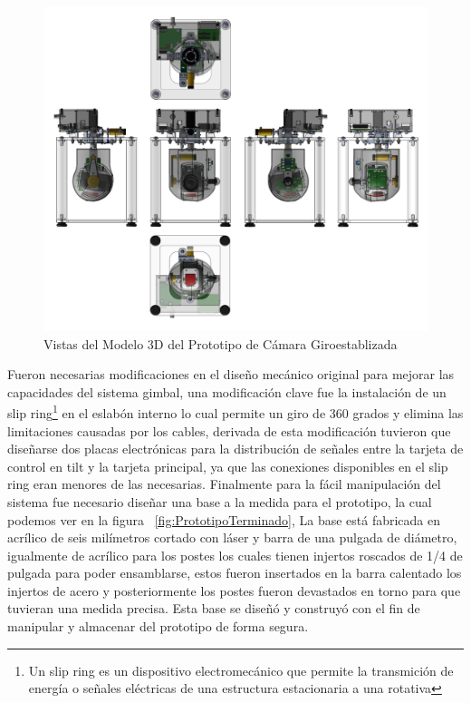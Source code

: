 \begin{figure}[H]
\centering \includegraphics[scale=0.25]{img/GimbalViews.png}
\caption{Vistas del Modelo 3D del Prototipo de C\'{a}mara Giroestablizada}%
\label{fig:GimbalViews}%
\end{figure}

Fueron necesarias modificaciones en el dise\~{n}o mec\'{a}nico original para mejorar las capacidades del sistema gimbal, una modificaci\'{o}n clave fue la instalaci\'{o}n de un slip ring\footnote{Un slip ring es un dispositivo electromec\'{a}nico que permite la transmici\'{o}n de energ\'{i}a o se\~{n}ales el\'{e}ctricas de una estructura estacionaria a una rotativa} en el eslab\'{o}n interno lo cual permite un giro de 360 grados y elimina las limitaciones causadas por los cables, derivada de esta modificaci\'{o}n tuvieron que dise\~{n}arse dos placas electr\'{o}nicas para la distribuci\'{o}n de se\~{n}ales entre la tarjeta de control en tilt y la tarjeta principal, ya que las conexiones disponibles en el slip ring eran menores de las necesarias. Finalmente para la f\'{a}cil manipulaci\'{o}n del sistema fue necesario dise\~{n}ar una base a la medida para el prototipo, la cual podemos ver en la figura ~\ref{fig:PrototipoTerminado}, La base est\'{a} fabricada en acr\'{i}lico de seis mil\'{i}metros cortado con l\'{a}ser y barra de una pulgada de di\'{a}metro, igualmente de acr\'{i}lico para los postes los cuales tienen injertos roscados de 1/4 de pulgada para poder ensamblarse, estos fueron insertados en la barra calentado los injertos de acero y posteriormente los postes fueron devastados en torno para que tuvieran una medida precisa. Esta base se dise\~{n}\'{o} y construy\'{o} con el fin de  manipular y almacenar del prototipo de forma segura.

